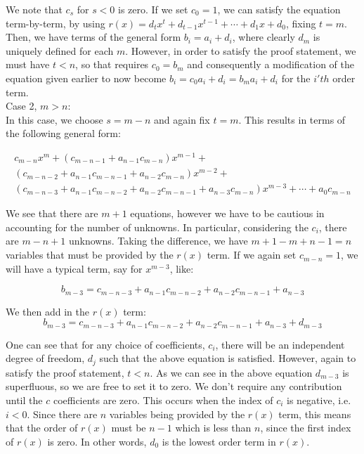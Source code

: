 We note that $c_{s}$ for $s < 0$ is zero.  If we set $c_{0}=1$, we can satisfy the equation term-by-term, by using $r(x)=d_{t}x^{t} + d_{t-1}x^{t-1} + \cdots + d_{1}x+d_{0}$, fixing $t=m$.  Then, we have terms of the general form $b_{i}=a_{i}+d_{i}$, where clearly $d_{m}$ is uniquely defined for each $m$.  However, in order to satisfy the proof statement, we must have $t < n$, so that requires $c_{0}=b_{m}$ and consequently a modification of the equation given earlier to now become $b_{i}=c_{0}a_{i} + d_{i}=b_{m}a_{i} + d_{i}$ for the $i'th$ order term.\\

Case 2,  $m > n$:\\

In this case, we choose $s=m-n$ and again fix $t=m$.  This results in terms of the following general form:

\begin{multline}
c_{m-n}x^{m}+ (c_{m-n-1}+a_{n-1}c_{m-n} ) x^{m-1} + \\ (c_{m-n-2}+a_{n-1}c_{m-n-1}+a_{n-2}c_{m-n} ) x^{m-2} +\\ (c_{m-n-3}+a_{n-1}c_{m-n-2}+a_{n-2}c_{m-n-1}+ a_{n-3}c_{m-n} ) x^{m-3} + \cdots + a_{0}c_{m-n}
\end{multline}

We see that there are $m+1$ equations, however we have to be cautious in accounting for the number of unknowns.  In particular, considering the $c_{i}$, there are $m-n+1$ unknowns.  Taking the difference, we have $m+1-m+n-1=n$ variables that must be provided by the $r(x)$ term.  If we again set $c_{m-n}=1$, we will have a typical term, say for $x^{m-3}$, like:

\begin{displaymath}
b_{m-3}=c_{m-n-3}+a_{n-1}c_{m-n-2}+a_{n-2}c_{m-n-1}+ a_{n-3} 
\end{displaymath}

We then add in the $r(x)$ term:\\

\begin{displaymath}
b_{m-3}=c_{m-n-3}+a_{n-1}c_{m-n-2}+a_{n-2}c_{m-n-1}+ a_{n-3} + d_{m-3}
\end{displaymath}

One can see that for any choice of coefficients, $c_{i}$, there will be an independent degree of freedom, $d_{j}$ such that the above equation is satisfied.  However, again to satisfy the proof statement, $t < n$.  As we can see in the above equation $d_{m-3}$ is superfluous, so we are free to set it to zero.  We don't require any contribution until the $c$ coefficients are zero.  This occurs when the index of $c_{i}$ is negative, i.e. $i < 0$.  Since there are $n$ variables being provided by the $r(x)$ term, this means that the order of $r(x)$ must be $n-1$ which is less than $n$, since the first index of $r(x)$ is zero.  In other words, $d_{0}$ is the lowest order term in $r(x)$. \\
 
